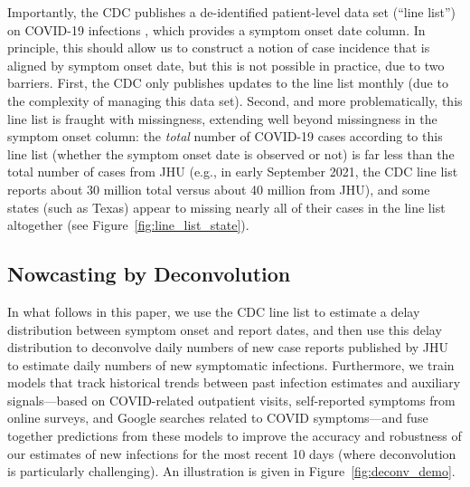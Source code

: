 \documentclass[sts]{imsart}
\theoremstyle{plain}
\theoremstyle{definition}
\theoremstyle{remark}
\begin{document}
Importantly, the CDC publishes a de-identified patient-level data set (``line
list'') on COVID-19 infections \citep{cdc_public}, which provides a symptom 
onset date column. In principle, this should allow us to construct a notion of
case incidence that is aligned by symptom onset date, but this is not possible
in practice, due to two barriers. First, the CDC only publishes updates to the 
line list monthly (due to the complexity of managing this data set). Second, 
and more problematically, this line list is fraught with missingness,
extending well beyond missingness in the symptom onset column: the \emph{total}
number of COVID-19 cases according to this line list (whether the symptom onset
date is observed or not) is far less than the total number of cases from JHU
(e.g., in early September 2021, the CDC line list reports about 30 million total
versus about 40 million from JHU), and some states (such as Texas) appear to 
missing nearly all of their cases in the line list altogether (see
Figure~\ref{fig:line_list_state}). 

\subsection{Nowcasting by Deconvolution}

In what follows in this paper, we use the CDC line list to estimate a delay
distribution between symptom onset and report dates, and then use this delay  
distribution to deconvolve daily numbers of new case reports published by JHU to
estimate daily numbers of new symptomatic infections. Furthermore, we train
models that track historical trends between past infection estimates and
auxiliary signals---based on COVID-related outpatient visits, self-reported
symptoms from online surveys, and Google searches related to COVID
symptoms---and fuse together predictions from these models to improve
the accuracy and robustness of our estimates of new infections for the most
recent 10 days (where deconvolution is particularly challenging). An
illustration is given in Figure~\ref{fig:deconv_demo}. 
\end{document}
